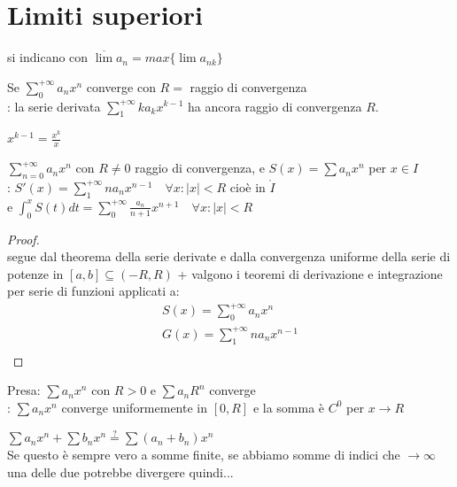 \documentclass[a4paper, oneside]{article}
\begin{document}
\section{Limiti superiori}
si indicano con $\overline{\lim} a_n = max\{ \lim a_{nk} \}$


\begin{theorem}
    Se $\sum_{0}^{+\infty} a_n x^n$ converge con $R = $ raggio di convergenza \\
    : la serie derivata $\sum_{1}^{+\infty} k a_k x^{k-1}$ ha ancora raggio di convergenza $R$.
\end{theorem}


\begin{observation}
  $x^{k-1} = \frac{x^k}{x}$
\end{observation}


\begin{theorem}
  $\sum_{n=0}^{+\infty} a_n x^n$ con $R \neq 0$ raggio di convergenza, e $S(x) = \sum a_n x^n$ per $x \in I$\\
  : $S'(x) = \sum_{1}^{+\infty} n a_n x^{n-1} \quad \forall x:|x| < R$ cioè in $\mathring{I}$\\
  e $\int_0^x S(t) dt = \sum_{0}^{+\infty} \frac{a_n}{n+1} x^{n+1} \quad \forall x: |x| < R$
\end{theorem}


\begin{proof}
  \hfil\\
  segue dal theorema della serie derivate e dalla convergenza uniforme della serie di potenze in $[a,b] \subseteq (-R,R)$ + valgono i teoremi di derivazione e integrazione per serie di funzioni applicati a:
  \begin{gather*}
    S(x) = \sum_{0}^{+\infty} a_n x^n \\
    G(x) = \sum_{1}^{+\infty} n a_n x^{n-1} \\
  \end{gather*}
\end{proof}


\begin{theorem}
  [di Abel]
  Presa: $\sum a_n x^n$ con $ R>0 $ e $\sum a_n R^n$ converge\\
  : $\sum a_n x^n $ converge uniformemente in $[0,R]$ e la somma è $C^0$ per $x \to R$
\end{theorem}


\begin{problem}
    $\sum a_n x^n + \sum b_n x^n \overset{?}{=} \sum (a_n + b_n) x^n$ \\
    Se questo è sempre vero a somme finite, se abbiamo somme di indici che $\to \infty$ una delle due potrebbe divergere quindi...
\end{problem}
\end{document}
